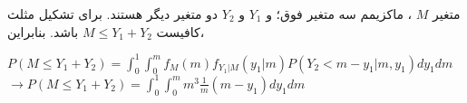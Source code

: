 متغیر
$ M $
، ماکزیمم سه متغیر فوق؛ و
$ Y_1 $
و
$ Y_2 $
دو متغیر دیگر هستند.
برای تشکیل مثلث کافیست
$ M \leq Y_1 + Y_2 $
باشد. بنابراین،
\begin{center}
	$ P(M \leq Y_1 + Y_2) = \int_{0}^{1} \int_{0}^{m} f_M(m) f_{Y_1|M}(y_1|m) P(Y_2 < m - y_1 |m, y_1) dy_1 dm$
	\\
	$ \rightarrow P(M \leq Y_1 + Y_2) = \int_{0}^{1} \int_{0}^{m} m^3 \frac{1}{m} (m - y_1) dy_1 dm $
\end{center}